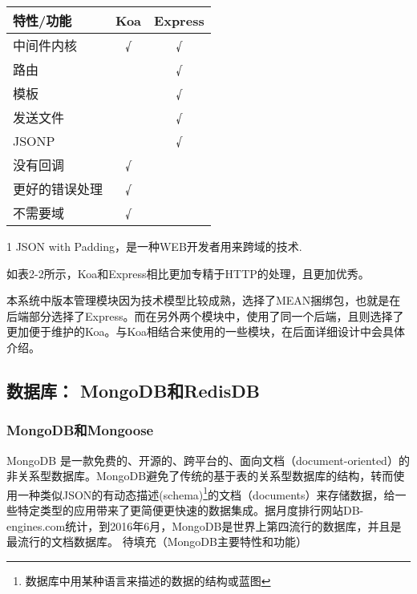 \begin{table}[!htpb]
  \centering
  \begin{threeparttable}[b]
    \begin{tabular}{lcc}
      \toprule
      特性/功能 & Koa & Express \\
      \midrule
      中间件内核 & √ & √ \\
      路由 & & √ \\
      模板 & & √ \\
      发送文件 &   & √ \\
      JSONP\tnote{1} &   & √ \\
      没有回调 & √ &  \\
      更好的错误处理 & √ &  \\
      不需要域 & √ &  \\
      \bottomrule
    \end{tabular}
    \begin{tablenotes}
    \item [1] JSON with Padding，是一种WEB开发者用来跨域的技术.
    \end{tablenotes}
  \end{threeparttable}
\end{table}

如表2-2所示，Koa和Express相比更加专精于HTTP的处理，且更加优秀。

本系统中版本管理模块因为技术模型比较成熟，选择了MEAN捆绑包，也就是在后端部分选择了Express。而在另外两个模块中，使用了同一个后端，且则选择了更加便于维护的Koa。与Koa相结合来使用的一些模块，在后面详细设计中会具体介绍。

\subsection{数据库： MongoDB和RedisDB}
\subsubsection{MongoDB和Mongoose}
MongoDB 是一款免费的、开源的、跨平台的、面向文档（document-oriented）的非关系型数据库。MongoDB避免了传统的基于表的关系型数据库的结构，转而使用一种类似JSON的有动态描述(schema)\footnote{数据库中用某种语言来描述的数据的结构或蓝图}的文档（documents）来存储数据，给一些特定类型的应用带来了更简便更快速的数据集成。据月度排行网站DB-engines.com统计，到2016年6月，MongoDB是世界上第四流行的数据库，并且是最流行的文档数据库。
待填充（MongoDB主要特性和功能）

